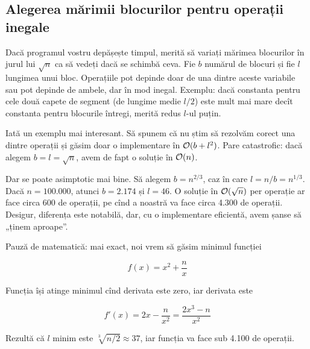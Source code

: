 \documentclass[../main.tex]{subfiles}
\begin{document}
\subsection{Alegerea mărimii blocurilor pentru operații inegale}

Dacă programul vostru depășește timpul, merită să variați mărimea blocurilor în jurul lui $\sqrt{n}$ ca să vedeți dacă se schimbă ceva. Fie $b$ numărul de blocuri și fie $l$ lungimea unui bloc. Operațiile pot depinde doar de una dintre aceste variabile sau pot depinde de ambele, dar în mod inegal. Exemplu: dacă constanta pentru cele două capete de segment (de lungime medie $l/2$) este mult mai mare decît constanta pentru blocurile întregi, merită redus $l$-ul puțin.

Iată un exemplu mai interesant. Să spunem că nu știm să rezolvăm corect una dintre operații și găsim doar o implementare în $\mathcal{O}(b + l^2)$. Pare catastrofic: dacă alegem $b=l=\sqrt{n}$, avem de fapt o soluție în $\mathcal{O}(n)$. 

Dar se poate asimptotic mai bine. Să alegem $b = n^{2/3}$, caz în care $l = n/b = n^{1/3}$. Dacă $n = 100.000$, atunci $b = 2.174$ și $l = 46$. O soluție în $\mathcal{O}(\sqrt{n})$ per operație ar face circa 600 de operații, pe cînd a noastră va face circa 4.300 de operații. Desigur, diferența este notabilă, dar, cu o implementare eficientă, avem șanse să „ținem aproape”.

Pauză de matematică: mai exact, noi vrem să găsim minimul funcției

$$f(x) = x^2 + \frac{n}{x}$$

Funcția își atinge minimul cînd derivata este zero, iar derivata este

$$f'(x) = 2x - \frac{n}{x^2} = \frac{2x^3 - n}{x^2}$$

Rezultă că $l$ minim este $\sqrt[3]{n/2} \approx 37$, iar funcția va face sub 4.100 de operații.
\end{document}
